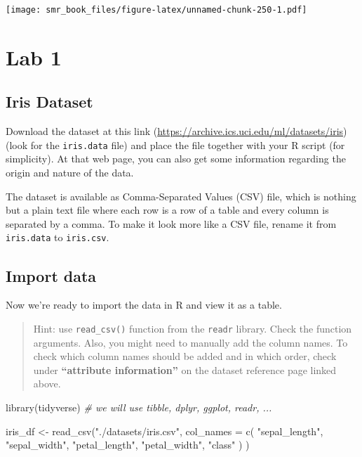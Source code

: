 \documentclass[
  oneside]{book}
\newenvironment{Shaded}{\begin{snugshade}}{\end{snugshade}}
\newcommand{\AttributeTok}[1]{\textcolor[rgb]{0.77,0.63,0.00}{#1}}
\newcommand{\CommentTok}[1]{\textcolor[rgb]{0.56,0.35,0.01}{\textit{#1}}}
\newcommand{\FunctionTok}[1]{\textcolor[rgb]{0.00,0.00,0.00}{#1}}
\newcommand{\NormalTok}[1]{#1}
\newcommand{\OtherTok}[1]{\textcolor[rgb]{0.56,0.35,0.01}{#1}}
\newcommand{\StringTok}[1]{\textcolor[rgb]{0.31,0.60,0.02}{#1}}
\begin{document}
\texttt{[image: smr\_book\_files/figure-latex/unnamed-chunk-250-1.pdf]}

\hypertarget{lab-1}{%
\chapter{Lab 1}\label{lab-1}}

\hypertarget{iris-dataset}{%
\section{Iris Dataset}\label{iris-dataset}}

Download the dataset at this link (\url{https://archive.ics.uci.edu/ml/datasets/iris})
(look for the \texttt{iris.data} file) and place the file together with your R script (for simplicity).
At that web page, you can also get some information regarding the origin and
nature of the data.

The dataset is available as Comma-Separated Values (CSV) file, which is nothing
but a plain text file where each row is a row of a table and every column is separated
by a comma. To make it look more like a CSV file, rename it from \texttt{iris.data} to \texttt{iris.csv}.

\hypertarget{import-data}{%
\section{Import data}\label{import-data}}

Now we're ready to import the data in R and view it as a table.

\begin{quote}
Hint: use \texttt{read\_csv()} function from the \texttt{readr} library. Check
the function arguments. Also, you might need to manually add the column names.
To check which column names should be added and in which order,
check under \textbf{``attribute information''} on the dataset reference page linked above.
\end{quote}

\begin{Shaded}
\begin{Highlighting}[]
\FunctionTok{library}\NormalTok{(tidyverse) }\CommentTok{\# we will use tibble, dplyr, ggplot, readr, ...}
\end{Highlighting}
\end{Shaded}

\begin{Shaded}
\begin{Highlighting}[]
\NormalTok{iris\_df }\OtherTok{\textless{}{-}} \FunctionTok{read\_csv}\NormalTok{(}\StringTok{"./datasets/iris.csv"}\NormalTok{,}
  \AttributeTok{col\_names =} \FunctionTok{c}\NormalTok{(}
    \StringTok{"sepal\_length"}\NormalTok{, }\StringTok{"sepal\_width"}\NormalTok{,}
    \StringTok{"petal\_length"}\NormalTok{, }\StringTok{"petal\_width"}\NormalTok{, }\StringTok{"class"}
\NormalTok{  )}
\NormalTok{)}
\end{Highlighting}
\end{Shaded}
\end{document}

